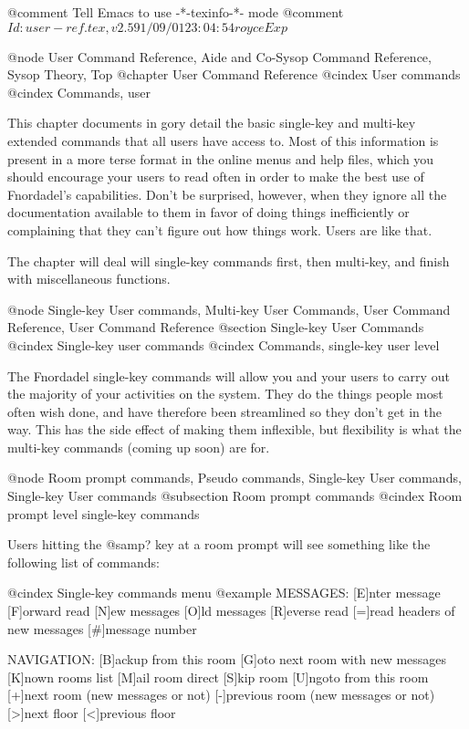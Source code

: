 @comment Tell Emacs to use -*-texinfo-*- mode
@comment $Id: user-ref.tex,v 2.5 91/09/01 23:04:54 royce Exp $

@node User Command Reference, Aide and Co-Sysop Command Reference, Sysop Theory, Top
@chapter User Command Reference
@cindex User commands
@cindex Commands, user

This chapter documents in gory detail the basic single-key and multi-key
extended commands that all users have access to.  Most of this information
is present in a more terse format in the online menus and help files, which
you should encourage your users to read often in order to make the best use
of Fnordadel's capabilities.  Don't be surprised, however, when they ignore
all the documentation available to them in favor of doing things inefficiently
or complaining that they can't figure out how things work.  Users are like
that.

The chapter will deal will single-key commands first, then multi-key,
and finish with miscellaneous functions.

@node Single-key User commands, Multi-key User Commands, User Command Reference, User Command Reference
@section Single-key User Commands
@cindex Single-key user commands
@cindex Commands, single-key user level

The Fnordadel single-key commands will allow you and your users to carry out
the majority of your activities on the system.  They do the things people most
often wish done, and have therefore been streamlined so they don't get in the way.
This has the side effect of making them inflexible, but flexibility is what the
multi-key commands (coming up soon) are for.

@node Room prompt commands, Pseudo commands, Single-key User commands, Single-key User commands
@subsection Room prompt commands
@cindex Room prompt level single-key commands

Users hitting the @samp{?} key at a room prompt will see something like
the following list of commands:

@cindex Single-key commands menu
@example
MESSAGES:
[E]nter message
[F]orward read
[N]ew messages
[O]ld messages
[R]everse read
[=]read headers of new messages
[#]message number

NAVIGATION:
[B]ackup from this room
[G]oto next room with new messages
[K]nown rooms list
[M]ail room direct
[S]kip room
[U]ngoto from this room
[+]next room (new messages or not)
[-]previous room (new messages or not)
[>]next floor
[<]previous floor

